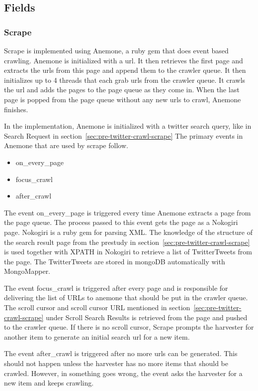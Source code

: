\subsection{Fields}
\subsubsection{Scrape}
Scrape is implemented using Anemone, a ruby gem that does event based crawling. Anemone is initialized with a url. It then retrieves the first page and extracts the urls from this page and append them to the crawler queue. It then initializes up to 4 threads that each grab urls from the crawler queue. It crawls the url and adds the pages to the page queue as they come in. When the last page is popped from the page queue without any new urls to crawl, Anemone finishes.

In the implementation, Anemone is initialized with a twitter search query, like in Search Request in section~\ref{sec:pre-twitter-crawl-scrape}
The primary events in Anemone that are used by scrape follow.

	\begin{itemize}
	\item on\_every\_page
	\item focus\_crawl
	\item after\_crawl
	\end{itemize}

The event on\_every\_page is triggered every time Anemone extracts a page from the page queue. The process passed to this event gets the page as a Nokogiri page. Nokogiri is a ruby gem for parsing XML. The knowledge of the structure of the search result page from the prestudy in section~\ref{sec:pre-twitter-crawl-scrape} is used together with XPATH in Nokogiri to retrieve a list of TwitterTweets from the page. The TwitterTweets are stored in mongoDB automatically with MongoMapper.

The event focus\_crawl is triggered after every page and is responsible for delivering the list of URLs to anemone that should be put in the crawler queue. The scroll cursor and scroll cursor URL mentioned in section~\ref{sec:pre-twitter-crawl-scrape} under Scroll Search Results is retrieved from the page and pushed to the crawler queue. If there is no scroll cursor, Scrape prompts the harvester for another item to generate an initial search url for a new item.

The event after\_crawl is triggered after no more urls can be generated. This should not happen unless the harvester has no more items that should be crawled. However, in something goes wrong, the event asks the harvester for a new item and keeps crawling.

